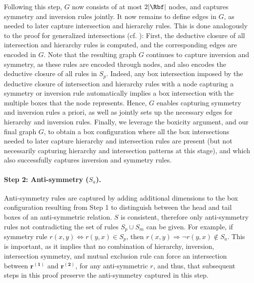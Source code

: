 \documentclass{article}
\begin{document}
Following this step, $G$ now consists of at most $2|\Rbf|$ nodes, and captures symmetry and inversion rules jointly. It now remains to define edges in $G$, as needed to later capture intersection and hierarchy rules. This is done analogously to the proof for generalized intersections (cf. ): First, the deductive closure of all intersection and hierarchy rules is computed, and the corresponding edges are encoded in $G$. Note that the resulting graph $G$ continues to capture inversion and symmetry, as these rules are encoded through nodes, and also encodes the deductive closure of all rules in $S_p$. Indeed, any box intersection imposed by the deductive closure of intersection and hierarchy rules with a node capturing a symmetry or inversion rule automatically implies a box intersection with the multiple boxes that the node represents. Hence, $G$ enables capturing symmetry and inversion rules a priori, as well as jointly sets up the necessary edges for hierarchy and inversion rules. Finally, we leverage the boxicity argument, and our final graph $G$, to obtain a box configuration where all the box intersections needed to later capture hierarchy and intersection rules are present (but not necessarily capturing hierarchy and intersection patterns at this stage), and which also successfully captures inversion and symmetry rules. 


\paragraph{Step 2: Anti-symmetry ($S_a$).} Anti-symmetry rules are captured by adding additional dimensions to the box configuration resulting from Step 1 to distinguish between the head and tail boxes of an anti-symmetric relation. $S$ is consistent, therefore only anti-symmetry rules not contradicting the set of rules $S_p \cup S_m$ can be given. For example, if symmetry rule $r(x,y) \Leftrightarrow r(y,x) \in S_{p}$, then $r(x,y) \Rightarrow \neg r(y,x) \notin S_a$. This is important, as it implies that no combination of hierarchy, inversion, intersection symmetry, and mutual exclusion rule can force an intersection between $\bm{r^{(1)}}$ and $\bm{r^{(2)}}$, for any anti-symmetric $r$, and thus, that subsequent steps in this proof preserve the anti-symmetry captured in this step.  
\end{document}
